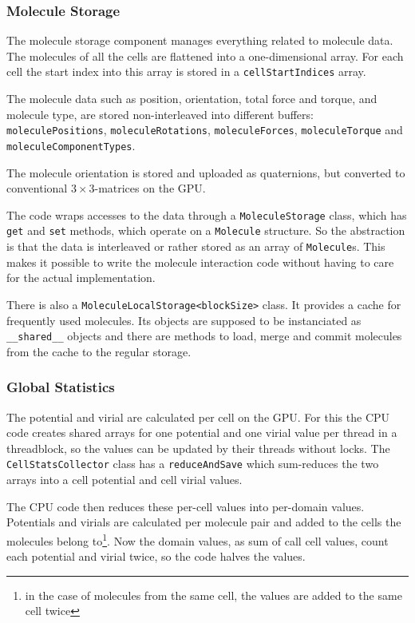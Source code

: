 \subsubsection{Molecule Storage}
The molecule storage component manages everything related to molecule data. The molecules of all the cells are flattened into a one-dimensional array. For each cell the start index into this array is stored in a \lstinline!cellStartIndices! array. 

The molecule data such as position, orientation, total force and torque, and molecule type, are stored non-interleaved into different buffers: \lstinline!moleculePositions!, \lstinline!moleculeRotations!, \lstinline!moleculeForces!, \lstinline!moleculeTorque! and \lstinline!moleculeComponentTypes!.

The molecule orientation is stored and uploaded as quaternions, but converted to conventional $ 3 \times 3 $-matrices on the GPU.

The \cuda{} code wraps accesses to the data through a \lstinline!MoleculeStorage! class, which has \lstinline!get! and \lstinline!set! methods, which operate on a \lstinline!Molecule! structure. So the abstraction is that the data is interleaved or rather stored as an array of \lstinline!Molecule!s. This makes it possible to write the molecule interaction code without having to care for the actual implementation.

There is also a \lstinline!MoleculeLocalStorage<blockSize>! class. It provides a cache for frequently used molecules. Its objects are supposed to be instanciated as \lstinline!__shared__! objects and there are methods to load, merge and commit molecules from the cache to the regular storage.

\subsubsection{Global Statistics}
The potential and virial are calculated per cell on the GPU. For this the CPU code creates shared arrays for one potential and one virial value per thread in a threadblock, so the values can be updated by their threads without locks. The \lstinline!CellStatsCollector! class has a \lstinline!reduceAndSave! which sum-reduces the two arrays into a cell potential and cell virial values.

The CPU code then reduces these per-cell values into per-domain values. Potentials and virials are calculated per molecule pair and added to the cells the molecules belong to\footnote{in the case of molecules from the same cell, the values are added to the same cell twice}. Now the domain values, as sum of call cell values, count each potential and virial twice, so the code halves the values.

